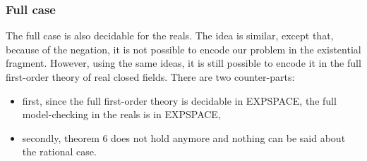 \subsubsection{Full case}

The full case is also decidable for the reals. The idea is similar, except that, because of the negation, it is not possible to encode our problem in the existential fragment. However, using the same ideas, it is still possible to encode it in the full first-order theory of real closed fields. There are two counter-parts:
\begin{itemize}
	\item first, since the full first-order theory is decidable in EXPSPACE, the full model-checking in the reals is in EXPSPACE,
	\item secondly, theorem 6 does not hold anymore and nothing can be said about the rational case.
\end{itemize}








